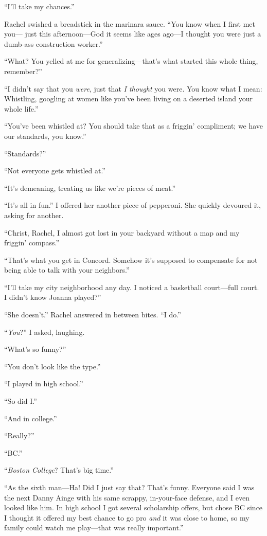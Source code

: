 ``I'll take my chances.''

Rachel swished a breadstick in the marinara sauce. ``You know when I
first met you--- just this afternoon---God it seems like ages ago---I
thought you were just a dumb-ass construction worker.''

``What? You yelled at me for generalizing---that's what started this
whole thing, remember?''

``I didn't say that you \emph{were}, just that \emph{I thought} you
were. You know what I mean: Whistling, googling at women like you've
been living on a deserted island your whole life.''

``You've been whistled at? You should take that as a friggin'
compliment; we have our standards, you know.''

``Standards?''

``Not everyone gets whistled at.''

``It's demeaning, treating us like we're pieces of meat.''

``It's all in fun.'' I offered her another piece of pepperoni. She
quickly devoured it, asking for another.

``Christ, Rachel, I almost got lost in your backyard without a map and
my friggin' compass.''

``That's what you get in Concord. Somehow it's supposed to compensate
for not being able to talk with your neighbors.''

``I'll take my city neighborhood any day. I noticed a basketball
court---full court. I didn't know Joanna played?''

``She doesn't.'' Rachel answered in between bites. ``I do.''

``\emph{You}?'' I asked, laughing.

``What's so funny?''

``You don't look like the type.''

``I played in high school.''

``So did I.''

``And in college.''

``Really?''

``BC.''

``\emph{Boston College}? That's big time.''

``As the sixth man---Ha! Did I just say that? That's funny. Everyone
said I was the next Danny Ainge with his same scrappy, in-your-face
defense, and I even looked like him. In high school I got several
scholarship offers, but chose BC since I thought it offered my best
chance to go pro \emph{and} it was close to home, so my family could
watch me play---that was really important.''

